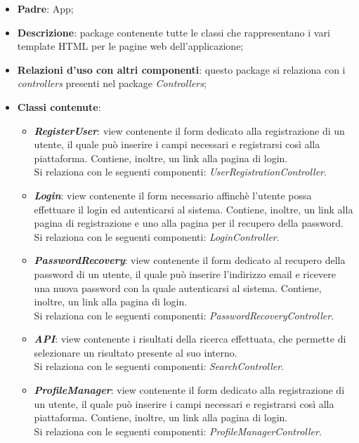 \begin{itemize}
	\item \textbf{Padre}: App;
	
	\item \textbf{Descrizione}: package contenente tutte le classi che rappresentano i vari template HTML per le pagine web dell'applicazione;
	
	\item \textbf{Relazioni d’uso con altri componenti}: questo package si relaziona con i \textit{controllers} presenti nel package \textit{Controllers};
	
	\item \textbf{Classi contenute}:
	\begin{itemize}
		\item \textbf{\textit{RegisterUser}}: view contenente il form dedicato alla registrazione di un utente, il quale può inserire i campi necessari e registrarsi così alla piattaforma. Contiene, inoltre, un link alla pagina di login.\\
		Si relaziona con le seguenti componenti: \textit{UserRegistrationController}.
		
		\item \textbf{\textit{Login}}: view contenente il form necessario affinchè l'utente possa effettuare il login ed autenticarsi al sistema. Contiene, inoltre, un link alla pagina di registrazione e uno alla pagina per il recupero della password.\\
		Si relaziona con le seguenti componenti: \textit{LoginController}.
		
		\item \textbf{\textit{PasswordRecovery}}: view contenente il form dedicato al recupero della password di un utente, il quale può inserire l'indirizzo email e ricevere una nuova password con la quale autenticarsi al sistema. Contiene, inoltre, un link alla pagina di login.\\
		Si relaziona con le seguenti componenti: \textit{PasswordRecoveryController}.
		
		\item \textbf{\textit{API}}: view contenente i risultati della ricerca effettuata, che permette di selezionare un risultato presente al suo interno.\\
		Si relaziona con le seguenti componenti: \textit{SearchController}.
		
		\item \textbf{\textit{ProfileManager}}: view contenente il form dedicato alla registrazione di un utente, il quale può inserire i campi necessari e registrarsi così alla piattaforma. Contiene, inoltre, un link alla pagina di login.\\
		Si relaziona con le seguenti componenti: \textit{ProfileManagerController}.
		

\end{itemize}
\end{itemize}
